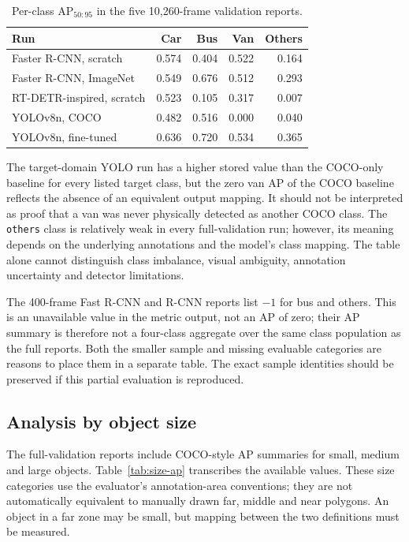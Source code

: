 \begin{table}[htbp]
\centering
\caption{Per-class AP$_{50:95}$ in the five 10,260-frame validation reports.}
\label{tab:class-ap}
\begin{tabular}{lrrrr}
\toprule
Run & Car & Bus & Van & Others \\
\midrule
Faster R-CNN, scratch & 0.574 & 0.404 & 0.522 & 0.164 \\
Faster R-CNN, ImageNet & 0.549 & 0.676 & 0.512 & 0.293 \\
RT-DETR-inspired, scratch & 0.523 & 0.105 & 0.317 & 0.007 \\
YOLOv8n, COCO & 0.482 & 0.516 & 0.000 & 0.040 \\
YOLOv8n, fine-tuned & 0.636 & 0.720 & 0.534 & 0.365 \\
\bottomrule
\end{tabular}
\end{table}

The target-domain YOLO run has a higher stored value than the COCO-only baseline for every listed target class, but the zero van AP of the COCO baseline reflects the absence of an equivalent output mapping. It should not be interpreted as proof that a van was never physically detected as another COCO class. The \texttt{others} class is relatively weak in every full-validation run; however, its meaning depends on the underlying annotations and the model's class mapping. The table alone cannot distinguish class imbalance, visual ambiguity, annotation uncertainty and detector limitations.

The 400-frame Fast R-CNN and R-CNN reports list $-1$ for bus and others. This is an unavailable value in the metric output, not an AP of zero; their AP summary is therefore not a four-class aggregate over the same class population as the full reports. Both the smaller sample and missing evaluable categories are reasons to place them in a separate table. The exact sample identities should be preserved if this partial evaluation is reproduced.

\subsection{Analysis by object size}
The full-validation reports include COCO-style AP summaries for small, medium and large objects. Table~\ref{tab:size-ap} transcribes the available values. These size categories use the evaluator's annotation-area conventions; they are not automatically equivalent to manually drawn far, middle and near polygons. An object in a far zone may be small, but mapping between the two definitions must be measured.

